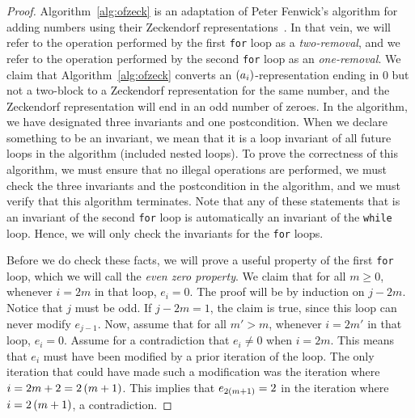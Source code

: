 \documentclass[english,12pt]{article}
\newcommand{\seq}{\p}
\begin{document}
\begin{proof}
Algorithm~\ref{alg:ofzeck} is an adaptation of Peter Fenwick's algorithm for adding numbers using their Zeckendorf representations~\cite{fenwick}.  In that vein, we will refer to the operation performed by the first \texttt{for} loop as a \emph{two-removal}, and we refer to the operation performed by the second \texttt{for} loop as an \emph{one-removal}.  We claim that Algorithm~\ref{alg:ofzeck} converts an $\seq{a_i}$-representation ending in $0$ but not a two-block to a Zeckendorf representation for the same number, and the Zeckendorf representation will end in an odd number of zeroes.  In the algorithm, we have designated three invariants and one postcondition.  When we declare something to be an invariant, we mean that it is a loop invariant of all future loops in the algorithm (included nested loops).  To prove the correctness of this algorithm, we must ensure that no illegal operations are performed, we must check the three invariants and the postcondition in the algorithm, and we must verify that this algorithm terminates.  Note that any of these statements that is an invariant of the second \texttt{for} loop is automatically an invariant of the \texttt{while} loop.  Hence, we will only check the invariants for the \texttt{for} loops.

Before we do check these facts, we will prove a useful property of the first \texttt{for} loop, which we will call the \emph{even zero property}. We claim that for all $m\geq0$, whenever $i=2m$ in that loop, $e_i=0$.  The proof will be by induction on $j-2m$.  Notice that $j$ must be odd.  If $j-2m=1$, the claim is true, since this loop can never modify $e_{j-1}$.  Now, assume that for all $m'>m$, whenever $i=2m'$ in that loop, $e_i=0$.  Assume for a contradiction that $e_i\neq0$ when $i=2m$.  This means that $e_i$ must have been modified by a prior iteration of the loop.  The only iteration that could have made such a modification was the iteration where $i=2m+2=2\left(m+1\right)$.  This implies that $e_{2\left(m+1\right)}=2$ in the iteration where $i=2\left(m+1\right)$, a contradiction.


\end{proof}
\end{document}

